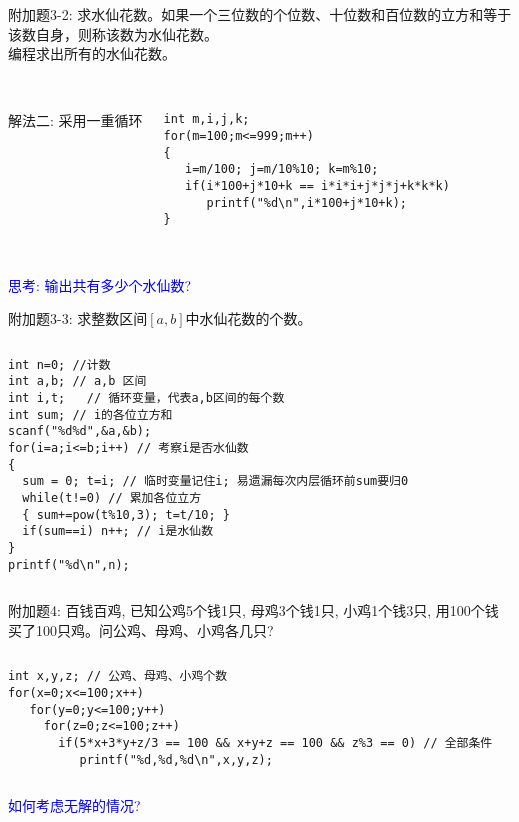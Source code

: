 \begin{frame}[fragile]
附加题3-2: 求水仙花数。如果一个三位数的个位数、十位数和百位数的立方和等于该数自身，则称该数为水仙花数。 \\
编程求出所有的水仙花数。\\
~\\ 
\pause
\begin{columns}
解法二: 采用一重循环
\begin{lstlisting}
int m,i,j,k; 
for(m=100;m<=999;m++)
{
   i=m/100; j=m/10%10; k=m%10;  
   if(i*100+j*10+k == i*i*i+j*j*j+k*k*k)  
      printf("%d\n",i*100+j*10+k);
}
\end{lstlisting}
\end{columns}
~\\
\pause
\textcolor{blue}{思考: 输出共有多少个水仙数?}
\end{frame}

\begin{frame}[fragile]
附加题3-3: 求整数区间$[a,b]$中水仙花数的个数。
\pause
\begin{columns}
\begin{lstlisting}
int n=0; //计数 
int a,b; // a,b 区间
int i,t;   // 循环变量，代表a,b区间的每个数
int sum; // i的各位立方和 
scanf("%d%d",&a,&b);
for(i=a;i<=b;i++) // 考察i是否水仙数
{  
  sum = 0; t=i; // 临时变量记住i; 易遗漏每次内层循环前sum要归0
  while(t!=0) // 累加各位立方 
  { sum+=pow(t%10,3); t=t/10; }
  if(sum==i) n++; // i是水仙数 
}
printf("%d\n",n);
\end{lstlisting}
\end{columns}
\end{frame}

\begin{frame}[fragile]
附加题4: 百钱百鸡, 已知公鸡5个钱1只, 母鸡3个钱1只, 小鸡1个钱3只, 用100个钱买了100只鸡。问公鸡、母鸡、小鸡各几只? 
\vspace{0.5cm}
\pause
\begin{columns}
\begin{lstlisting}
int x,y,z; // 公鸡、母鸡、小鸡个数
for(x=0;x<=100;x++) 
   for(y=0;y<=100;y++) 
     for(z=0;z<=100;z++) 
       if(5*x+3*y+z/3 == 100 && x+y+z == 100 && z%3 == 0) // 全部条件 
          printf("%d,%d,%d\n",x,y,z);
\end{lstlisting}
\end{columns}
\vspace{0.5cm}
\pause
\textcolor{blue}{如何考虑无解的情况?}
\end{frame}

